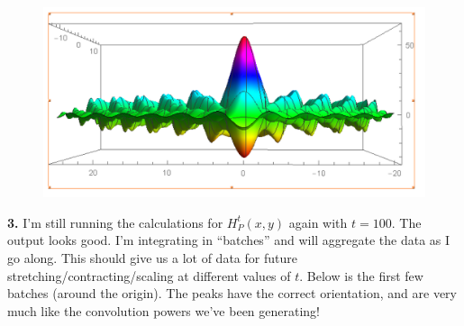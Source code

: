 \documentclass{article}
\theoremstyle{definition}
\begin{document}
\begin{figure}[!htb]
	\includegraphics[scale=0.4]{conv-5}
\end{figure}








\newpage

\noindent \textbf{3.} I'm still running the calculations for $H^t_P(x,y)$ again with $t = 100$. The output looks good. I'm integrating in ``batches'' and will aggregate the data as I go along. This should give us a lot of data for future stretching/contracting/scaling at different values of $t$. Below is the first few batches (around the origin). The peaks have the correct orientation, and are very much like the convolution powers we've been generating!
\end{document}
